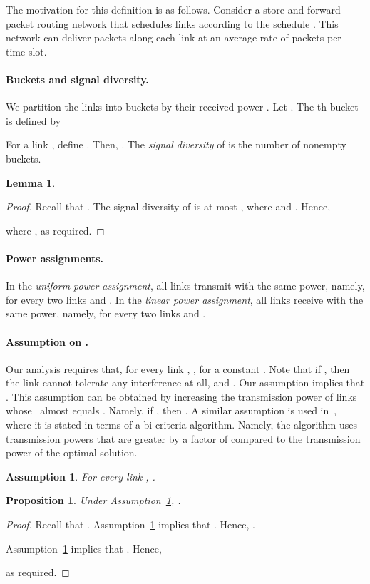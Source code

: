 \documentclass[11pt]{article}
\newenvironment{proof sketch}{\noindent {\bf Proof sketch:} }{\hfill \qed}
\newtheorem{proposition}{Proposition}
\newtheorem{lemma}{Lemma}
\newtheorem{assumption}{Assumption}
\newcommand{\snr}{\text{\sc{snr}}}
\begin{document}
The motivation for this definition is as follows. Consider a store-and-forward packet
routing network that schedules links according to the schedule .
This network can
deliver packets along each link  at an average rate of 
packets-per-time-slot.

\paragraph{Buckets and signal diversity.}
We partition the links into buckets by their received power  . Let .
The th bucket  is defined by


For a link , define .  Then, .  The \emph{signal diversity}  of 
is the number of nonempty buckets.

\begin{lemma}\label{lem:dive}
    
\end{lemma}

\begin{proof}
    Recall that .
    The signal diversity of  is at most
    , where  and .
    Hence,
    
    where , as required.
\end{proof}

\paragraph{Power assignments.}
In the \emph{uniform power assignment}, all links transmit with the same
power, namely,  for every two links  and .
In the \emph{linear power assignment}, all links receive with the same
power, namely,  for every two links  and .

\paragraph{Assumption on \snr.} Our analysis requires that, for every
link , , for a constant .
Note that if , then the link cannot tolerate any
interference at all, and .  Our assumption implies
that .  This assumption can be
obtained by increasing the transmission power of links whose \snr\
almost equals .  Namely, if , then
.  A similar assumption is used
in~\cite{ChafekarCapacity}, where it is stated in terms of a
bi-criteria algorithm. Namely, the algorithm uses transmission powers
that are greater by a factor of  compared to the transmission power
of the optimal solution.
\begin{assumption}\label{assume:gamma}
  For every link , .
\end{assumption}
\begin{proposition}\label{prop:gamma}
  Under Assumption~\ref{assume:gamma}, .
\end{proposition}
\begin{proof}
    Recall that .
    Assumption~\ref{assume:gamma} implies that  .
    Hence, .

    Assumption~\ref{assume:gamma} implies that  .
    Hence,
    
    as required.
\end{proof}
\end{document}
